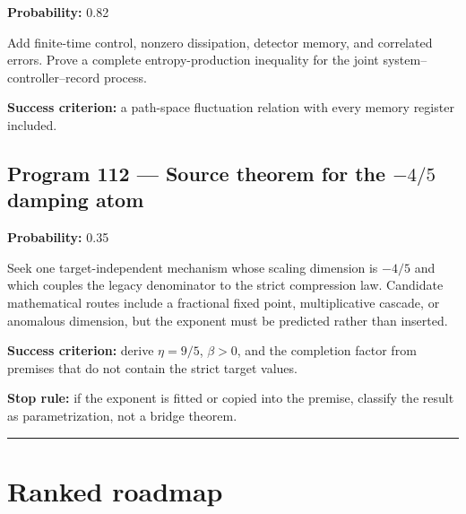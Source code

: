 \documentclass[11pt,a4paper,openany]{report}
\begin{document}
\textbf{Probability:} 0.82

Add finite-time control, nonzero dissipation, detector memory, and correlated errors. Prove a complete entropy-production inequality for the joint system--controller--record process.

\textbf{Success criterion:} a path-space fluctuation relation with every memory register included.

\section{\texorpdfstring{Program 112 --- Source theorem for the \(-4/5\) damping atom}{Program 112 --- Source theorem for the -4/\allowbreak{}5 damping atom}}

\textbf{Probability:} 0.35

Seek one target-independent mechanism whose scaling dimension is \(-4/5\) and which couples the legacy denominator to the strict compression law. Candidate mathematical routes include a fractional fixed point, multiplicative cascade, or anomalous dimension, but the exponent must be predicted rather than inserted.

\textbf{Success criterion:} derive \(\eta=9/5\), \(\beta>0\), and the completion factor from premises that do not contain the strict target values.

\textbf{Stop rule:} if the exponent is fitted or copied into the premise, classify the result as parametrization, not a bridge theorem.

\par\medskip\hrule\medskip

\chapter{Ranked roadmap}
\end{document}
